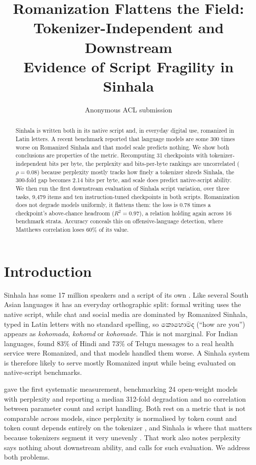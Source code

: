\documentclass[11pt]{article}
\title{Romanization Flattens the Field: Tokenizer-Independent and Downstream\\
Evidence of Script Fragility in Sinhala}
\author{Anonymous ACL submission}
\newcommand{\si}[1]{{\sinhalafont #1}}
\newcommand{\rom}[1]{\textit{#1}}
\begin{document}
\maketitle

\begin{abstract}
Sinhala is written both in its native script and, in everyday digital use, romanized
in Latin letters. A recent benchmark reported that language models are some 300 times
worse on Romanized Sinhala and that model scale predicts nothing. We show both
conclusions are properties of the metric. Recomputing 31 checkpoints with
tokenizer-independent bits per byte, the perplexity and bits-per-byte rankings are
uncorrelated ($\rho = 0.08$) because perplexity mostly tracks how finely a tokenizer
shreds Sinhala, the 300-fold gap becomes 2.14 bits per byte, and scale does predict
native-script ability. We then run the first downstream evaluation of Sinhala script
variation, over three tasks, 9{,}479 items and ten instruction-tuned checkpoints in
both scripts. Romanization does not degrade models uniformly, it flattens them: the
loss is 0.78 times a checkpoint's above-chance headroom ($R^2 = 0.97$), a relation
holding again across 16 benchmark strata. Accuracy conceals this on offensive-language
detection, where Matthews correlation loses 60\% of its value.
\end{abstract}

\section{Introduction}
\label{sec:intro}

Sinhala has some 17 million speakers and a script of its own
\citep{ranasinghe-etal-2025-sold}. Like several South Asian languages it has an
everyday orthographic split: formal writing uses the native script, while chat and
social media are dominated by Romanized Sinhala, typed in Latin letters with no
standard spelling, so \si{කොහොමද} (``how are you'') appears as \rom{kohomada},
\rom{kohomd} or \rom{kohomade}. This is not marginal. For Indian languages,
\citet{khullar-etal-2025-scriptgap} found 83\% of Hindi and 73\% of Telugu messages
to a real health service were Romanized, and that models handled them worse. A
Sinhala system is therefore likely to serve mostly Romanized input while being
evaluated on native-script benchmarks.

\citet{rajapakse-weerasinghe-2026-script} gave the first systematic measurement,
benchmarking 24 open-weight models with perplexity and reporting a median 312-fold
degradation and no correlation between parameter count and script handling. Both rest
on a metric that is not comparable across models, since perplexity is normalised by
token count and token count depends entirely on the tokenizer
\citep{gao-etal-2020-pile, magnusson-etal-2024-paloma}, and Sinhala is where that
matters because tokenizers segment it very unevenly
\citep{petrov-etal-2023-tokenizers, ahia-etal-2023-languages}. That work also notes
perplexity says nothing about downstream ability, and calls for such evaluation. We
address both problems.
\end{document}
